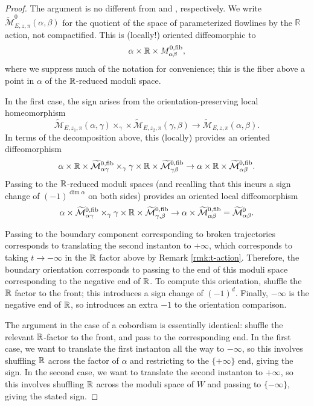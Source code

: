 \documentclass[10pt,a4paper]{amsart}
\theoremstyle{definition}
\theoremstyle{remark}
\numberwithin{figure}{qchap}
\begin{document}
\begin{proof}The argument is no different from \cite[Proposition~20.5.2]{KMSW} and \cite[Proposition~25.1.1]{KMSW}, respectively. We write $\widetilde{\mathcal M}^0_{E, z, \pi}(\alpha, \beta)$ for the quotient of the space of parameterized flowlines by the $\mathbb R$ action, not compactified. This is (locally!) oriented diffeomorphic to $$\alpha \times \Bbb R \times M^{0,\text{fib}}_{\alpha \beta},$$ where we suppress much of the notation for convenience; this is the fiber above a point in $\alpha$ of the $\Bbb R$-reduced moduli space. 

In the first case, the sign arises from the orientation-preserving local homeomorphism $$\widetilde{\mathcal M}_{E,z_1,\pi}(\alpha, \gamma) \times_\gamma \times \widetilde{\mathcal M}_{E,z_2,\pi}(\gamma, \beta) \to \widetilde{\mathcal M}_{E,z,\pi}(\alpha, \beta).$$ In terms of the decomposition above, this (locally) provides an oriented diffeomorphism $$\alpha \times \Bbb R \times \widetilde{\mathcal M}^{0,\text{fib}}_{\alpha \gamma} \times_\gamma \gamma \times \Bbb R \times \widetilde{\mathcal M}^{0,\text{fib}}_{\gamma \beta} \to \alpha \times \Bbb R \times \widetilde{\mathcal M}^{0,\text{fib}}_{\alpha \beta}.$$ Passing to the $\Bbb R$-reduced moduli spaces (and recalling that this incurs a sign change of $(-1)^{\dim \alpha}$ on both sides) provides an oriented local diffeomorphism $$\alpha \times \widetilde{\mathcal M}^{0,\text{fib}}_{\alpha \gamma} \times_\gamma \gamma \times \Bbb R \times \widetilde{\mathcal M}^{0,\text{fib}}_{\gamma, \beta} \to \alpha \times \widetilde{\mathcal M}^{0,\text{fib}}_{\alpha \beta} = \widetilde{\mathcal M}^0_{\alpha \beta}.$$ 

Passing to the boundary component corresponding to broken trajectories corresponds to translating the second instanton to $+\infty$, which corresponds to taking $t \to -\infty$ in the $\Bbb R$ factor above by Remark \ref{rmk:t-action}. Therefore, the boundary orientation corresponds to passing to the end of this moduli space corresponding to the negative end of $\Bbb R$. To compute this orientation, shuffle the $\Bbb R$ factor to the front; this introduces a sign change of $(-1)^d$. Finally, $-\infty$ is the negative end of $\Bbb R$, so introduces an extra $-1$ to the orientation comparison. 

The argument in the case of a cobordism is essentially identical: shuffle the relevant $\Bbb R$-factor to the front, and pass to the corresponding end. In the first case, we want to translate the first instanton all the way to $-\infty$, so this involves shuffling $\Bbb R$ across the factor of $\alpha$ and restricting to the $\{+\infty\}$ end, giving the sign. In the second case, we want to translate the second instanton to $+\infty$, so this involves shuffling $\Bbb R$ across the moduli space of $W$ and passing to $\{-\infty\}$, giving the stated sign.
\end{proof}
\end{document}
